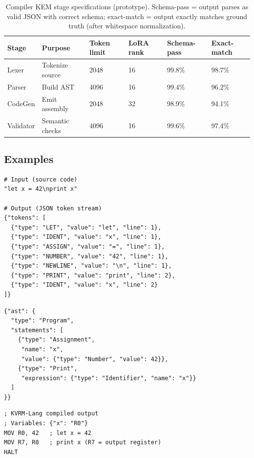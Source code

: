 \documentclass[11pt]{article}
\begin{document}
\begin{table}[h]
\centering
\caption{Compiler KEM stage specifications (prototype). Schema-pass = output parses as valid JSON with correct schema; exact-match = output exactly matches ground truth (after whitespace normalization).}
\label{tab:stage_specs}
\begin{tabular}{llllll}
\toprule
Stage & Purpose & Token limit & LoRA rank & Schema-pass & Exact-match \\
\midrule
Lexer & Tokenize source & 2048 & 16 & 99.8\% & 98.7\% \\
Parser & Build AST & 4096 & 16 & 99.4\% & 96.2\% \\
CodeGen & Emit assembly & 2048 & 32 & 98.9\% & 94.1\% \\
Validator & Semantic checks & 4096 & 16 & 99.6\% & 97.4\% \\
\bottomrule
\end{tabular}
\end{table}

\subsection{Examples}
\begin{lstlisting}[caption={Lexer KEM: source to JSON tokens.},label={lst:lexer}]
# Input (source code)
"let x = 42\nprint x"

# Output (JSON token stream)
{"tokens": [
  {"type": "LET", "value": "let", "line": 1},
  {"type": "IDENT", "value": "x", "line": 1},
  {"type": "ASSIGN", "value": "=", "line": 1},
  {"type": "NUMBER", "value": "42", "line": 1},
  {"type": "NEWLINE", "value": "\n", "line": 1},
  {"type": "PRINT", "value": "print", "line": 2},
  {"type": "IDENT", "value": "x", "line": 2}
]}
\end{lstlisting}

\begin{lstlisting}[caption={Parser KEM: tokens to AST.},label={lst:parser}]
{"ast": {
  "type": "Program",
  "statements": [
    {"type": "Assignment",
     "name": "x",
     "value": {"type": "Number", "value": 42}},
    {"type": "Print",
     "expression": {"type": "Identifier", "name": "x"}}
  ]
}}
\end{lstlisting}

\begin{lstlisting}[caption={CodeGen KEM: AST to assembly.},label={lst:codegen}]
; KVRM-Lang compiled output
; Variables: {"x": "R0"}
MOV R0, 42   ; let x = 42
MOV R7, R0   ; print x (R7 = output register)
HALT
\end{lstlisting}
\end{document}
